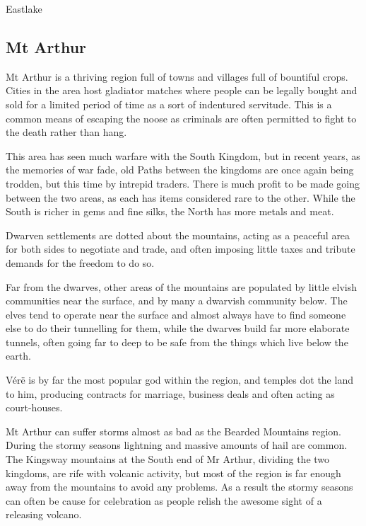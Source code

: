 \begin{multicols}{2}
\begin{encounters}{Eastlake}
\end{encounters}

\subsection{Mt Arthur}

Mt Arthur is a thriving region full of towns and villages full of bountiful crops.  Cities in the area host gladiator matches where people can be legally bought and sold for a limited period of time as a sort of indentured servitude.  This is a common means of escaping the noose as criminals are often permitted to fight to the death rather than hang.

	This area has seen much warfare with the South Kingdom, but in recent years, as the memories of war fade, old Paths between the kingdoms are once again being trodden, but this time by intrepid traders.  There is much profit to be made going between the two areas, as each has items considered rare to the other.  While the South is richer in gems and fine silks, the North has more metals and meat.

	Dwarven settlements are dotted about the mountains, acting as a peaceful area for both sides to negotiate and trade, and often imposing little taxes and tribute demands for the freedom to do so.

	Far from the dwarves, other areas of the mountains are populated by little elvish communities near the surface, and by many a dwarvish community below.  The elves tend to operate near the surface and almost always have to find someone else to do their tunnelling for them, while the dwarves build far more elaborate tunnels, often going far to deep to be safe from the things which live below the earth.

	V\'{e}r\"{e} is by far the most popular god within the region, and temples dot the land to him, producing contracts for marriage, business deals and often acting as court-houses.

	Mt Arthur can suffer storms almost as bad as the Bearded Mountains region.  During the stormy seasons lightning and massive amounts of hail are common.  The Kingsway mountains at the South end of Mr Arthur, dividing the two kingdoms, are rife with volcanic activity, but most of the region is far enough away from the mountains to avoid any problems.  As a result the stormy seasons can often be cause for celebration as people relish the awesome sight of a releasing volcano.




\end{multicols}
